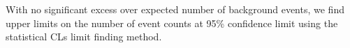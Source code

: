 \vspace{5mm} 
With no significant excess over expected number of background events, we find upper limits on the number of event counts at 95\% confidence limit using the statistical CLs limit finding method.
\label{Search_Analysis_chapter}